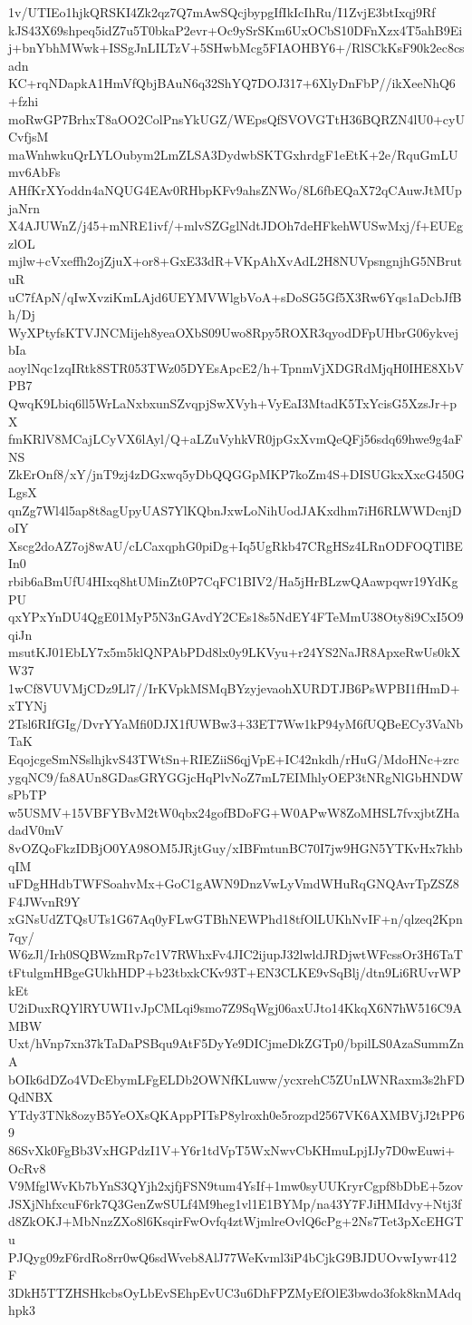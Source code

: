 1v/UTIEo1hjkQRSKI4Zk2qz7Q7mAwSQcjbypgIfIkIcIhRu/I1ZvjE3btIxqj9Rf
kJS43X69shpeq5idZ7u5T0bkaP2evr+Oc9ySrSKm6UxOCbS10DFnXzx4T5ahB9Ei
j+bnYbhMWwk+ISSgJnLILTzV+5SHwbMcg5FIAOHBY6+/RlSCkKsF90k2ec8csadn
KC+rqNDapkA1HmVfQbjBAuN6q32ShYQ7DOJ317+6XlyDnFbP//ikXeeNhQ6+fzhi
moRwGP7BrhxT8aOO2ColPnsYkUGZ/WEpsQfSVOVGTtH36BQRZN4lU0+cyUCvfjsM
maWnhwkuQrLYLOubym2LmZLSA3DydwbSKTGxhrdgF1eEtK+2e/RquGmLUmv6AbFs
AHfKrXYoddn4aNQUG4EAv0RHbpKFv9ahsZNWo/8L6fbEQaX72qCAuwJtMUpjaNrn
X4AJUWnZ/j45+mNRE1ivf/+mlvSZGglNdtJDOh7deHFkehWUSwMxj/f+EUEgzlOL
mjlw+cVxeffh2ojZjuX+or8+GxE33dR+VKpAhXvAdL2H8NUVpsngnjhG5NBrutuR
uC7fApN/qIwXvziKmLAjd6UEYMVWlgbVoA+sDoSG5Gf5X3Rw6Yqs1aDcbJfBh/Dj
WyXPtyfsKTVJNCMijeh8yeaOXbS09Uwo8Rpy5ROXR3qyodDFpUHbrG06ykvejbIa
aoylNqc1zqIRtk8STR053TWz05DYEsApcE2/h+TpnmVjXDGRdMjqH0IHE8XbVPB7
QwqK9Lbiq6ll5WrLaNxbxunSZvqpjSwXVyh+VyEaI3MtadK5TxYcisG5XzsJr+pX
fmKRlV8MCajLCyVX6lAyl/Q+aLZuVyhkVR0jpGxXvmQeQFj56sdq69hwe9g4aFNS
ZkErOnf8/xY/jnT9zj4zDGxwq5yDbQQGGpMKP7koZm4S+DISUGkxXxcG450GLgsX
qnZg7Wl4l5ap8t8agUpyUAS7YlKQbnJxwLoNihUodJAKxdhm7iH6RLWWDcnjDoIY
Xscg2doAZ7oj8wAU/cLCaxqphG0piDg+Iq5UgRkb47CRgHSz4LRnODFOQTlBEIn0
rbib6aBmUfU4HIxq8htUMinZt0P7CqFC1BIV2/Ha5jHrBLzwQAawpqwr19YdKgPU
qxYPxYnDU4QgE01MyP5N3nGAvdY2CEs18s5NdEY4FTeMmU38Oty8i9CxI5O9qiJn
msutKJ01EbLY7x5m5klQNPAbPDd8lx0y9LKVyu+r24YS2NaJR8ApxeRwUs0kXW37
1wCf8VUVMjCDz9Ll7//IrKVpkMSMqBYzyjevaohXURDTJB6PsWPBI1fHmD+xTYNj
2Tsl6RIfGIg/DvrYYaMfi0DJX1fUWBw3+33ET7Ww1kP94yM6fUQBeECy3VaNbTaK
EqojcgeSmNSslhjkvS43TWtSn+RIEZiiS6qjVpE+IC42nkdh/rHuG/MdoHNc+zrc
ygqNC9/fa8AUn8GDasGRYGGjcHqPlvNoZ7mL7EIMhlyOEP3tNRgNlGbHNDWsPbTP
w5USMV+15VBFYBvM2tW0qbx24gofBDoFG+W0APwW8ZoMHSL7fvxjbtZHadadV0mV
8vOZQoFkzIDBjO0YA98OM5JRjtGuy/xIBFmtunBC70I7jw9HGN5YTKvHx7khbqIM
uFDgHHdbTWFSoahvMx+GoC1gAWN9DnzVwLyVmdWHuRqGNQAvrTpZSZ8F4JWvnR9Y
xGNsUdZTQsUTs1G67Aq0yFLwGTBhNEWPhd18tfOlLUKhNvIF+n/qlzeq2Kpn7qy/
W6zJl/Irh0SQBWzmRp7c1V7RWhxFv4JIC2ijupJ32lwldJRDjwtWFcssOr3H6TaT
tFtulgmHBgeGUkhHDP+b23tbxkCKv93T+EN3CLKE9vSqBlj/dtn9Li6RUvrWPkEt
U2iDuxRQYlRYUWI1vJpCMLqi9smo7Z9SqWgj06axUJto14KkqX6N7hW516C9AMBW
Uxt/hVnp7xn37kTaDaPSBqu9AtF5DyYe9DICjmeDkZGTp0/bpilLS0AzaSummZnA
bOIk6dDZo4VDcEbymLFgELDb2OWNfKLuww/ycxrehC5ZUnLWNRaxm3s2hFDQdNBX
YTdy3TNk8ozyB5YeOXsQKAppPITsP8ylroxh0e5rozpd2567VK6AXMBVjJ2tPP69
86SvXk0FgBb3VxHGPdzI1V+Y6r1tdVpT5WxNwvCbKHmuLpjIJy7D0wEuwi+OcRv8
V9MfglWvKb7bYnS3QYjh2xjfjFSN9tum4YsIf+1mw0syUUKryrCgpf8bDbE+5zov
JSXjNhfxcuF6rk7Q3GenZwSULf4M9heg1vl1E1BYMp/na43Y7FJiHMIdvy+Ntj3f
d8ZkOKJ+MbNnzZXo8l6KsqirFwOvfq4ztWjmlreOvlQ6cPg+2Ns7Tet3pXcEHGTu
PJQyg09zF6rdRo8rr0wQ6sdWveb8AlJ77WeKvml3iP4bCjkG9BJDUOvwIywr412F
3DkH5TTZHSHkcbsOyLbEvSEhpEvUC3u6DhFPZMyEfOlE3bwdo3fok8knMAdqhpk3

